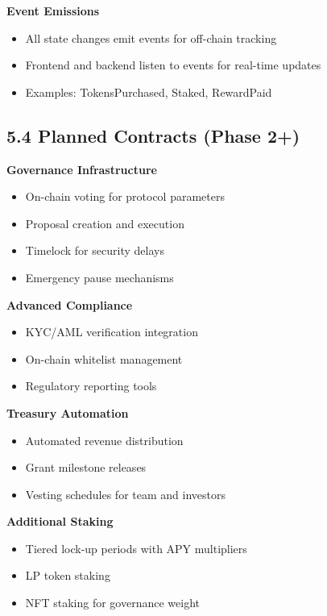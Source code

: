 \documentclass[
  paper=a4,
  ,captions=tableheading
]{scrartcl}
\providecommand{\tightlist}{%
  \setlength{\itemsep}{0pt}\setlength{\parskip}{0pt}}
\begin{document}
\textbf{Event Emissions}

\begin{itemize}
\tightlist
\item
  All state changes emit events for off-chain tracking
\item
  Frontend and backend listen to events for real-time updates
\item
  Examples: TokensPurchased, Staked, RewardPaid
\end{itemize}

\subsection{5.4 Planned Contracts (Phase 2+)}\label{planned-contracts}

\textbf{Governance Infrastructure}

\begin{itemize}
\tightlist
\item
  On-chain voting for protocol parameters
\item
  Proposal creation and execution
\item
  Timelock for security delays
\item
  Emergency pause mechanisms
\end{itemize}

\textbf{Advanced Compliance}

\begin{itemize}
\tightlist
\item
  KYC/AML verification integration
\item
  On-chain whitelist management
\item
  Regulatory reporting tools
\end{itemize}

\textbf{Treasury Automation}

\begin{itemize}
\tightlist
\item
  Automated revenue distribution
\item
  Grant milestone releases
\item
  Vesting schedules for team and investors
\end{itemize}

\textbf{Additional Staking}

\begin{itemize}
\tightlist
\item
  Tiered lock-up periods with APY multipliers
\item
  LP token staking
\item
  NFT staking for governance weight
\end{itemize}
\end{document}
